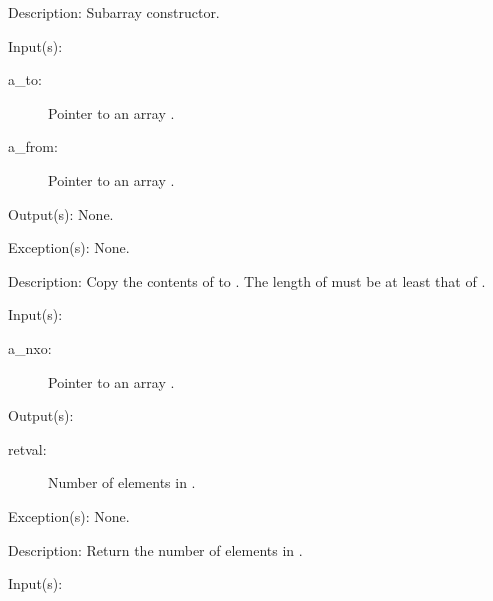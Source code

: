 \begin{capi}
\begin{capilist}
\begin{description}
		\end{description}
	\item[Description: ]
		Subarray constructor.
	\end{capilist}
\label{nxo_array_copy}
	\begin{capilist}
	\item[Input(s): ]
		\begin{description}\item[]
		\item[a\_to: ]
			Pointer to an array .
		\item[a\_from: ]
			Pointer to an array .
		\end{description}
	\item[Output(s): ] None.
	\item[Exception(s): ] None.
	\item[Description: ]
		Copy the contents of  to .  The length
		of  must be at least that of .
	\end{capilist}
\label{nxo_array_len_get}
	\begin{capilist}
	\item[Input(s): ]
		\begin{description}\item[]
		\item[a\_nxo: ]
			Pointer to an array \classname{nxo}.
		\end{description}
	\item[Output(s): ]
		\begin{description}\item[]
		\item[retval: ]
			Number of elements in \cvar{a\_nxo}.
		\end{description}
	\item[Exception(s): ] None.
	\item[Description: ]
		Return the number of elements in \cvar{a\_nxo}.
	\end{capilist}
\label{nxo_array_el_get}
	\begin{capilist}
	\item[Input(s): ]
		\begin{description}\item[]

\end{description}
\end{capilist}
\end{capi}
